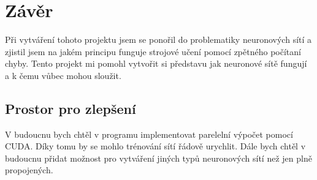 \section{Závěr}
Při vytváření tohoto projektu jsem se ponořil do problematiky neuronových sítí a zjistil jsem na jakém principu funguje strojové učení pomocí zpětného počítaní chyby.
Tento projekt mi pomohl vytvořit si představu jak neuronové sítě fungují a k čemu vůbec mohou sloužit.

\subsection{Prostor pro zlepšení}
V budoucnu bych chtěl v programu implementovat parelelní výpočet pomocí CUDA. Díky tomu by se mohlo trénování sítí řádově urychlit.
Dále bych chtěl v budoucnu přidat možnost pro vytváření jiných typů neuronových sítí než jen plně propojených.